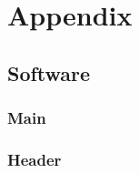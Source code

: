 





\newpage

\newpage
\section{Appendix}
\subsection{Software}
	\subsubsection{Main}
	
	\subsubsection{Header}


